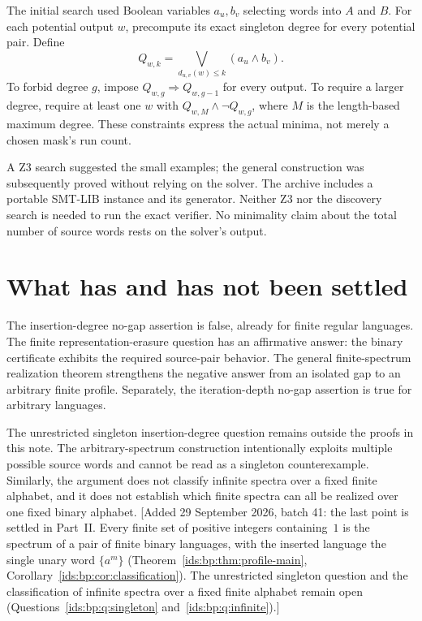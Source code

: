 \documentclass[11pt,letterpaper]{article}
\theoremstyle{definition}\newtheorem{definition}[theorem]{Definition}
\theoremstyle{remark}\newtheorem{remark}[theorem]{Remark}
\theoremstyle{definition}\newtheorem{question}[theorem]{Question}
\begin{document}
The initial search used Boolean variables $a_u,b_v$ selecting words into $A$ and $B$. For each potential output $w$, precompute its exact singleton degree for every potential pair. Define
\[
 Q_{w,k}=\bigvee_{d_{u,v}(w)\leq k}(a_u\wedge b_v).
\]
To forbid degree $g$, impose $Q_{w,g}\Rightarrow Q_{w,g-1}$ for every output. To require a larger degree, require at least one $w$ with $Q_{w,M}\wedge\neg Q_{w,g}$, where $M$ is the length-based maximum degree. These constraints express the actual minima, not merely a chosen mask's run count.

A Z3 search suggested the small examples; the general construction was subsequently proved without relying on the solver. The archive includes a portable SMT-LIB instance and its generator. Neither Z3 nor the discovery search is needed to run the exact verifier. No minimality claim about the total number of source words rests on the solver's output.

\section{What has and has not been settled}

The insertion-degree no-gap assertion is false, already for finite regular languages. The finite representation-erasure question has an affirmative answer: the binary certificate exhibits the required source-pair behavior. The general finite-spectrum realization theorem strengthens the negative answer from an isolated gap to an arbitrary finite profile. Separately, the iteration-depth no-gap assertion is true for arbitrary languages.

The unrestricted singleton insertion-degree question remains outside the proofs in this note. The arbitrary-spectrum construction intentionally exploits multiple possible source words and cannot be read as a singleton counterexample. Similarly, the argument does not classify infinite spectra over a fixed finite alphabet, and it does not establish which finite spectra can all be realized over one fixed binary alphabet.
[Added 29 September 2026, batch 41: the last point is settled in Part~II. Every finite set of positive integers containing~$1$ is the spectrum of a pair of finite binary languages, with the inserted language the single unary word $\{a^m\}$ (Theorem~\ref{ids:bp:thm:profile-main}, Corollary~\ref{ids:bp:cor:classification}). The unrestricted singleton question and the classification of infinite spectra over a fixed finite alphabet remain open (Questions~\ref{ids:bp:q:singleton} and~\ref{ids:bp:q:infinite}).]
\end{document}

